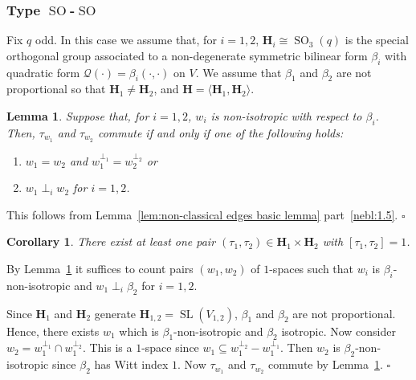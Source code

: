 \documentclass[12pt]{amsart}
\newtheorem{lemma}[theorem]{Lemma}
\newtheorem{corollary}[theorem]{Corollary}
\theoremstyle{definition}
\newcommand{\bpf}{\noindent{\bf Proof}\hspace{7pt}}
\newcommand{\epf}{\qed}
\newcommand{\ble}{\begin{lemma}}
\newcommand{\ele}{\end{lemma}}
\newcommand{\bco}{\begin{corollary}}
\newcommand{\eco}{\end{corollary}}
\newcommand{\sbe}{\subseteq}
\newcommand{\cQ}{{\mathcal Q}}
\DeclareMathOperator{\SL}{SL}
\DeclareMathOperator{\SO}{SO}
\renewcommand{\qed}{\hfill $\square$}
\newcommand{\amgrpH}{{\mathbf{H}}}
\begin{document}
\subsubsection{Type $\SO$-$\SO$}\label{subsub:SOSO}
Fix $q$ odd. In this case we assume that, for $i=1,2$,  $\amgrpH_i\cong\SO_3(q)$ is the special orthogonal group associated to a non-degenerate symmetric bilinear form $
\beta_i$ with quadratic form $\cQ(\cdot)=\beta_i(\cdot,\cdot)$ on $V$.
We assume that $\beta_1$ and $\beta_2$ are not proportional so that $\amgrpH_1\ne \amgrpH_2$, and $\amgrpH=\langle \amgrpH_1,\amgrpH_2\rangle$.


\ble\label{lem:commuting involutions}
Suppose that, for $i=1,2$, $w_i$ is non-isotropic with respect to $\beta_i$.
Then, $\tau_{w_1}$ and $\tau_{w_2}$ commute if and only if one of the following holds:
\begin{enumerate}
\item $w_1=w_2$ and $w_1^{\perp_1}=w_2^{\perp_2}$ or 
\item $w_1\perp_i w_2$ for $i=1,2$.
\end{enumerate}
\ele
\bpf
This follows from Lemma~\ref{lem:non-classical edges basic lemma} part~\eqref{nebl:1.5}.
\epf

\bco\label{cor:SOSOcommutingpair}
There exist at least one pair $(\tau_1,\tau_2)\in \amgrpH_1\times\amgrpH_2$ with $[\tau_1,\tau_2]=1$.
\eco
\bpf
By Lemma~\ref{lem:commuting involutions} it suffices to count pairs $(w_1,w_2)$ of $1$-spaces 
 such that $w_i$ is $\beta_i$-non-isotropic and $w_1\perp_i \beta_2$ for $i=1,2$.

Since $\amgrpH_1$ and $\amgrpH_2$ generate $\amgrpH_{1,2}=\SL(V_{1,2})$, $\beta_1$ and $\beta_2$ are not proportional. Hence, there exists $w_1$ which is $\beta_1$-non-isotropic and $\beta_2$ isotropic.
Now consider $w_2=w_1^{\perp_1}\cap w_1^{\perp_2}$. This is a $1$-space since $w_1\sbe w_1^{\perp_2}-w_1^{\perp_1}$.
Then $w_2$ is $\beta_2$-non-isotropic since $\beta_2$ has Witt index $1$. 
Now $\tau_{w_1}$ and $\tau_{w_2}$ commute by Lemma~\ref{lem:commuting involutions}.
\epf
\end{document}

